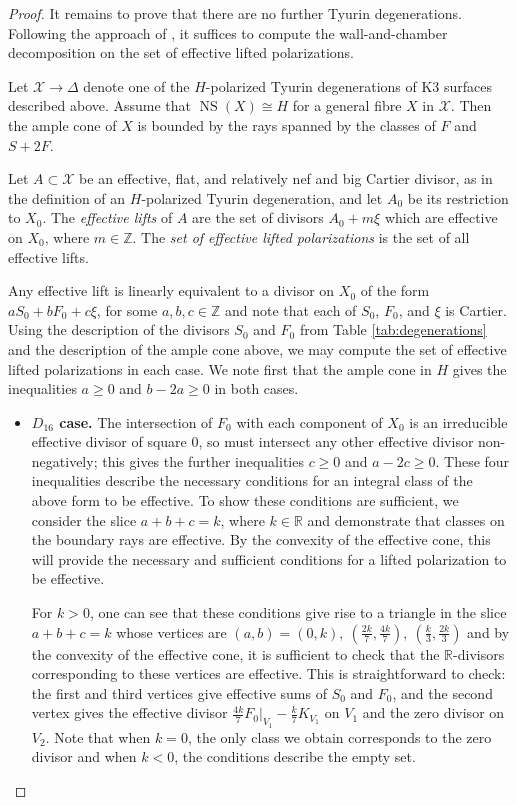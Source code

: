 \documentclass[a4paper]{amsart}
\theoremstyle{definition}
\theoremstyle{plain}
\theoremstyle{remark}
\newcommand{\bZ}{\mathbb{Z}}
\newcommand{\calX}{\mathcal{X}}
\DeclareMathOperator{\NS}{NS}
\numberwithin{figure}{section}
\numberwithin{table}{section}
\begin{document}
\begin{proof}
It remains to prove that there are no further Tyurin degenerations. Following the approach of \cite[Section 5]{t2dk3sd4}, it suffices to compute the wall-and-chamber decomposition on the set of effective lifted polarizations.

Let $\calX \to \Delta$ denote one of the $H$-polarized Tyurin degenerations of K3 surfaces described above. Assume that $\NS(X) \cong H$ for a general fibre $X$ in $\calX$. Then the ample cone of $X$ is bounded by the rays spanned by the classes of $F$ and $S+2F$.

Let $A \subset \calX$ be an effective, flat, and relatively nef and big Cartier divisor, as in the definition of an $H$-polarized Tyurin degeneration, and let $A_0$ be its restriction to $X_0$. The \emph{effective lifts} of $A$ are the set of divisors $A_0 + m \xi$ which are effective on $X_0$, where $m \in \bZ$. The \emph{set of effective lifted polarizations} is the set of all effective lifts.

Any effective lift is linearly equivalent to a divisor on $X_0$ of the form $aS_0 + bF_0 + c \xi$, for some $a,b,c \in \bZ$ and note that each of $S_0$, $F_0$, and $\xi$ is Cartier. Using the description of the divisors $S_0$ and $F_0$  from Table \ref{tab:degenerations} and the description of the ample cone above, we may compute the set of effective lifted polarizations in each case. We note first that the ample cone in $H$ gives the inequalities $a \geq 0$ and $b -2a \geq 0$ in both cases. 
\begin{itemize}[leftmargin=*]
\item \textbf{$D_{16}$ case.} The intersection of $F_0$ with each component of $X_0$ is an irreducible effective divisor of square $0$, so must intersect any other effective divisor non-negatively; this gives the further inequalities $c \geq 0$ and $a - 2c \geq 0$. These four inequalities describe the necessary conditions for an integral class of the above form to be effective. To show these conditions are sufficient, we consider the slice $a+b+c=k$, where $k\in \mathbb{R}$ and demonstrate that classes on the boundary rays are effective. By the convexity of the effective cone, this will provide the necessary and sufficient conditions for a lifted polarization to be effective.

For $k>0$, one can see that these conditions give rise to a triangle in the slice $a+b+c = k$ whose vertices are $(a,b) = (0,k),~ \left(\frac{2k}{7},\frac{4k}{7}\right),~ \left(\frac{k}{3},\frac{2k}{3}\right)$ and by the convexity of the effective cone, it is sufficient to check that the $\mathbb{R}$-divisors corresponding to these vertices are effective. This is straightforward to check: the first and third vertices give effective sums of $S_0$ and $F_0$, and the second vertex gives the effective divisor $\frac{4k}{7}F_0|_{V_1} - \frac{k}{7}K_{V_1}$ on $V_1$ and the zero divisor on $V_2$. Note that when $k=0$, the only class we obtain corresponds to the zero divisor and when $k<0$, the conditions describe the empty set.


\end{itemize}
\end{proof}
\end{document}
